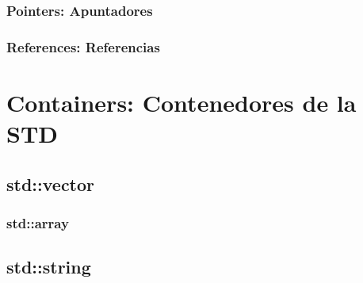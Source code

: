 \documentclass[12pt, fleqn]{report}                             %
\theoremstyle{break}                                            %
\begin{document}
            \subsection{Pointers: Apuntadores}

            \subsection{References: Referencias}


    \clearpage
    \chapter{Containers: Contenedores de la STD}

        \section{std::vector}

            \subsection{std::array}

        
        \section{std::string}
\end{document}
